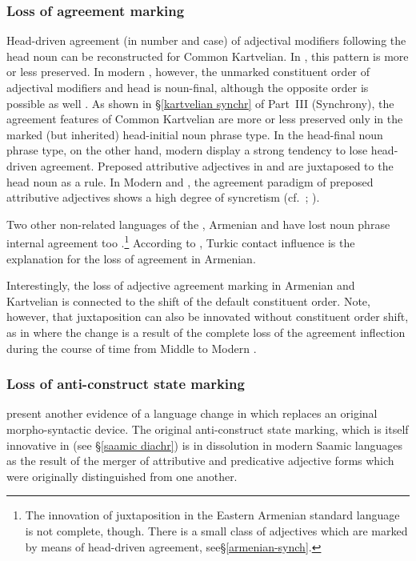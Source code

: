 {\subsubsection{Loss of agreement marking}
Head\hyp{}driven agreement (in number and case) of adjectival modifiers following the head noun can be reconstructed for Common Kartvelian. In , this pattern is more or less preserved. In modern , however, the unmarked constituent order of adjectival modifiers and head is noun-final, although the opposite order is possible as well \citep[56]{harris1991a}. As shown in \S\ref{kartvelian synchr} of Part~III (Synchrony), the agreement features of Common Kartvelian are more or less preserved only in the marked (but inherited) head-initial noun phrase type. In the head-final noun phrase type, on the other hand, modern  display a strong tendency to lose head\hyp{}driven agreement. Preposed attributive adjectives in  and  are juxtaposed to the head noun as a rule. In Modern  and , the agreement paradigm of preposed attributive adjectives shows a high degree of syncretism (cf.~\citealt[56]{harris1991a}; \citealt[56–60, passim]{tuite1998}).

Two other non-related languages of the , Armenian and  have lost noun phrase internal agreement too \citep[272–281]{stolz2015a}.\footnote{The innovation of juxtaposition in the Eastern Armenian standard language is not complete, though. There is a small class of adjectives which are marked by means of head-driven agreement, see\S\ref{armenian-synch}.} According to \citet[109]{johanson2002a}, Turkic contact influence is the explanation for the loss of agreement in Armenian. 

Interestingly, the loss of adjective agreement marking in Armenian and Kartvelian is connected to the shift of the default constituent order. Note, however, that juxtaposition can also be innovated without constituent order shift, as in  where the change is a result of the complete loss of the agreement inflection during the course of time from Middle to Modern . 

\subsubsection{Loss of anti\hyp{}construct state marking}
 present another evidence of a language change in which  replaces an original morpho-syntactic device. The original anti\hyp{}construct state marking, which is itself innovative in  (see \S\ref{saamic diachr}) is in dissolution in modern Saamic languages as the result of the merger of attributive and predicative adjective forms which were originally distinguished from one another.

}
